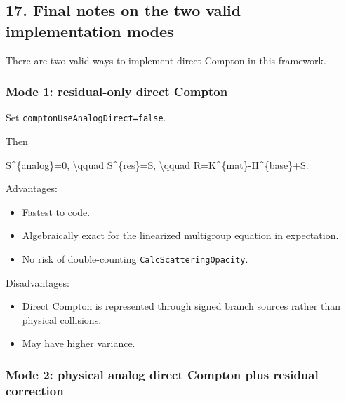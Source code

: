 \documentclass[
]{article}
\newenvironment{Shaded}{}{}
\newcommand{\NormalTok}[1]{#1}
\providecommand{\tightlist}{%
  \setlength{\itemsep}{0pt}\setlength{\parskip}{0pt}}
\begin{document}
\subsection{17. Final notes on the two valid implementation
modes}\label{final-notes-on-the-two-valid-implementation-modes}

There are two valid ways to implement direct Compton in this framework.

\subsubsection{Mode 1: residual-only direct
Compton}\label{mode-1-residual-only-direct-compton}

Set \texttt{comptonUseAnalogDirect=false}.

Then

\begin{Shaded}
\begin{Highlighting}[]
\NormalTok{S\^{}\{analog\}=0,}
\NormalTok{\textbackslash{}qquad}
\NormalTok{S\^{}\{res\}=S,}
\NormalTok{\textbackslash{}qquad}
\NormalTok{R=K\^{}\{mat\}{-}H\^{}\{base\}+S.}
\end{Highlighting}
\end{Shaded}

Advantages:

\begin{itemize}
\tightlist
\item
  Fastest to code.
\item
  Algebraically exact for the linearized multigroup equation in
  expectation.
\item
  No risk of double-counting \texttt{CalcScatteringOpacity}.
\end{itemize}

Disadvantages:

\begin{itemize}
\tightlist
\item
  Direct Compton is represented through signed branch sources rather
  than physical collisions.
\item
  May have higher variance.
\end{itemize}

\subsubsection{Mode 2: physical analog direct Compton plus residual
correction}\label{mode-2-physical-analog-direct-compton-plus-residual-correction}
\end{document}
